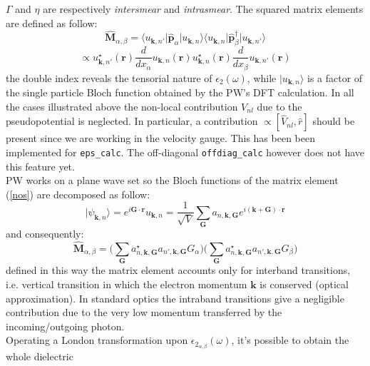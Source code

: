 \documentclass[twocolumn]{article}
\begin{document}
$\Gamma$ and $\eta$ are respectively \emph{intersmear} and \emph{intrasmear}. 
The squared matrix elements are defined as follow:
\begin{equation}
\hat{\textbf{M}}_{\alpha,\beta}=\langle u_{\textbf{k},n'}\vert\hat{\textbf{p}}_{\alpha}\vert u_{\textbf{k},n}\rangle
\langle u_{\textbf{k},n}\vert\hat{\textbf{p}}_{\beta}^{\dagger}\vert u_{\textbf{k},n'}\rangle
\label{nos}
\end{equation}
\begin{equation}
\propto u_{\textbf{k},n'}^{\star}(\textbf{r})\frac{d}{d x_{\alpha}}u_{\textbf{k},n}(\textbf{r})
u_{\textbf{k},n}^{\star}(\textbf{r})\frac{d}{d x_{\beta}}u_{\textbf{k},n'}(\textbf{r})
\end{equation}
the double index reveals the tensorial nature of $\epsilon_{2}(\omega)$, while $\vert u_{\textbf{k},n}\rangle$ is a
factor of the single particle Bloch function obtained by the PW's DFT calculation.
In all the cases illustrated above the non-local contribution $V_{nl}$ due to the pseudopotential is neglected. In particular,
a contribution $\propto [\hat V_{nl},\hat r]$ should be present since we are working in the velocity gauge. This has been
been implemented for \texttt{eps\_calc}. The off-diagonal \texttt{offdiag\_calc} however does not have this feature yet.\\
PW works on a plane wave set so the Bloch functions of the matrix element (\ref{nos}) are decomposed as follow:
\begin{equation}
\vert \psi_{\textbf{k},n}\rangle=e^{i\textbf{G}\cdot\textbf{r}}u_{\textbf{k},n}=\frac{1}{\sqrt{V}}\sum_{\textbf{G}}a_{n,\textbf{k},\textbf{G}}
e^{i(\textbf{k}+\textbf{G})\cdot\textbf{r}}
\end{equation}
and consequently:
\begin{equation}
\hat{\textbf{M}}_{\alpha,\beta}=\bigg(\sum_{\textbf{G}}a^{\star}_{n,\textbf{k},\textbf{G}}a_{n',\textbf{k},\textbf{G}}
G_{\alpha}\bigg) \bigg(\sum_{\textbf{G}}a^{\star}_{n,\textbf{k},\textbf{G}}a_{n',\textbf{k},\textbf{G}}
G_{\beta}\bigg)
\end{equation}
defined in this way the matrix element accounts only for interband transitions, i.e. vertical transition in which the
electron momentum $\textbf{k}$ is conserved (optical approximation). In standard optics the intraband transitions give a 
negligible contribution due to the very low momentum transferred by the incoming/outgoing photon.\\
Operating a London transformation upon $\epsilon_{2_{\alpha,\beta}}(\omega)$, it's possible to obtain the whole dielectric
\end{document}
